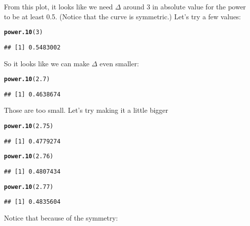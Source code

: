 \documentclass[addpoints,12pt]{exam}\usepackage[]{graphicx}\usepackage[]{color}
\makeatletter
\newcommand{\hlnum}[1]{\textcolor[rgb]{0.686,0.059,0.569}{#1}}%
\newcommand{\hlstd}[1]{\textcolor[rgb]{0.345,0.345,0.345}{#1}}%
\newcommand{\hlkwd}[1]{\textcolor[rgb]{0.737,0.353,0.396}{\textbf{#1}}}%
\newenvironment{kframe}{%
 \def\at@end@of@kframe{}%
 \ifinner\ifhmode%
  \def\at@end@of@kframe{\end{minipage}}%
  \begin{minipage}{\columnwidth}%
 \fi\fi%
 \def\FrameCommand##1{\hskip\@totalleftmargin \hskip-\fboxsep
 \colorbox{shadecolor}{##1}\hskip-\fboxsep
     \hskip-\linewidth \hskip-\@totalleftmargin \hskip\columnwidth}%
 \MakeFramed {\advance\hsize-\width
   \@totalleftmargin\z@ \linewidth\hsize
   \@setminipage}}%
 {\par\unskip\endMakeFramed%
 \at@end@of@kframe}
\newenvironment{knitrout}{}{} %
\makeatother
\begin{document}
\begin{questions}
\begin{parts}
\begin{solution}
\begin{knitrout}
\end{knitrout}
From this plot, it looks like we need $\Delta$ around 3 in absolute value for the power to be at least 0.5. (Notice that the curve is symmetric.) Let's try a few values:
\begin{knitrout}
\color{fgcolor}\begin{kframe}
\begin{alltt}
\hlkwd{power.10}\hlstd{(}\hlnum{3}\hlstd{)}
\end{alltt}
\begin{verbatim}
## [1] 0.5483002
\end{verbatim}
\end{kframe}
\end{knitrout}
So it looks like we can make $\Delta$ even smaller:
\begin{knitrout}
\color{fgcolor}\begin{kframe}
\begin{alltt}
\hlkwd{power.10}\hlstd{(}\hlnum{2.7}\hlstd{)}
\end{alltt}
\begin{verbatim}
## [1] 0.4638674
\end{verbatim}
\end{kframe}
\end{knitrout}
Those are too small. Let's try making it a little bigger
\begin{knitrout}
\color{fgcolor}\begin{kframe}
\begin{alltt}
\hlkwd{power.10}\hlstd{(}\hlnum{2.75}\hlstd{)}
\end{alltt}
\begin{verbatim}
## [1] 0.4779274
\end{verbatim}
\begin{alltt}
\hlkwd{power.10}\hlstd{(}\hlnum{2.76}\hlstd{)}
\end{alltt}
\begin{verbatim}
## [1] 0.4807434
\end{verbatim}
\begin{alltt}
\hlkwd{power.10}\hlstd{(}\hlnum{2.77}\hlstd{)}
\end{alltt}
\begin{verbatim}
## [1] 0.4835604
\end{verbatim}
\end{kframe}
\end{knitrout}
Notice that because of the symmetry:

\end{solution}
\end{parts}
\end{questions}
\end{document}
